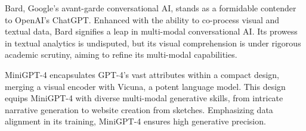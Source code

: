 \documentclass[twocolumn,11pt]{report}
\begin{document}
Bard, Google's avant-garde conversational AI, stands as a formidable contender to OpenAI's ChatGPT. Enhanced with the ability to co-process visual and textual data, Bard signifies a leap in multi-modal conversational AI. Its prowess in textual analytics is undisputed, but its visual comprehension is under rigorous academic scrutiny, aiming to refine its multi-modal capabilities\cite{qin2023good}.

MiniGPT-4 encapsulates GPT-4's vast attributes within a compact design, merging a visual encoder with Vicuna, a potent language model. This design equips MiniGPT-4 with diverse multi-modal generative skills, from intricate narrative generation to website creation from sketches. Emphasizing data alignment in its training, MiniGPT-4 ensures high generative precision\cite{zhu2023minigpt4}.
\end{document}

